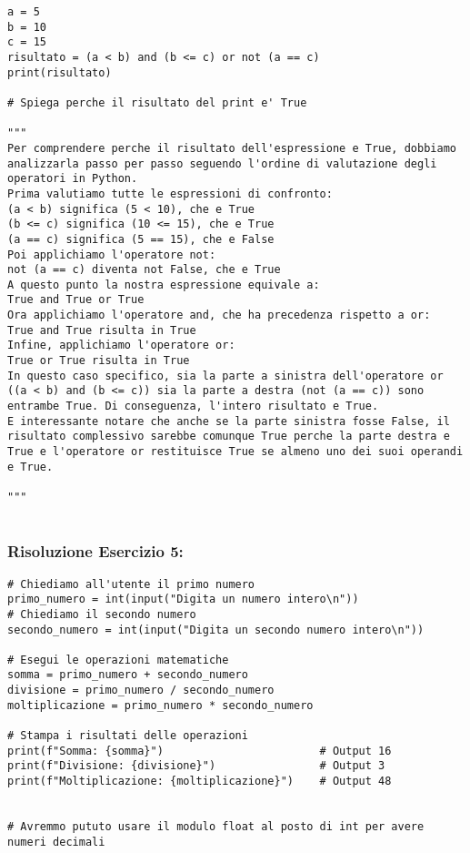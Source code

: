 \begin{lstlisting}
a = 5
b = 10
c = 15
risultato = (a < b) and (b <= c) or not (a == c)
print(risultato)

# Spiega perche il risultato del print e' True

"""
Per comprendere perche il risultato dell'espressione e True, dobbiamo analizzarla passo per passo seguendo l'ordine di valutazione degli operatori in Python.
Prima valutiamo tutte le espressioni di confronto:
(a < b) significa (5 < 10), che e True
(b <= c) significa (10 <= 15), che e True
(a == c) significa (5 == 15), che e False
Poi applichiamo l'operatore not:
not (a == c) diventa not False, che e True
A questo punto la nostra espressione equivale a:
True and True or True
Ora applichiamo l'operatore and, che ha precedenza rispetto a or:
True and True risulta in True
Infine, applichiamo l'operatore or:
True or True risulta in True
In questo caso specifico, sia la parte a sinistra dell'operatore or ((a < b) and (b <= c)) sia la parte a destra (not (a == c)) sono entrambe True. Di conseguenza, l'intero risultato e True.
E interessante notare che anche se la parte sinistra fosse False, il risultato complessivo sarebbe comunque True perche la parte destra e True e l'operatore or restituisce True se almeno uno dei suoi operandi e True.

"""


\end{lstlisting}



\vspace{0.3cm}

\subsubsection{Risoluzione Esercizio 5: \textit{}}

\begin{lstlisting}
# Chiediamo all'utente il primo numero
primo_numero = int(input("Digita un numero intero\n"))
# Chiediamo il secondo numero
secondo_numero = int(input("Digita un secondo numero intero\n"))

# Esegui le operazioni matematiche
somma = primo_numero + secondo_numero
divisione = primo_numero / secondo_numero
moltiplicazione = primo_numero * secondo_numero

# Stampa i risultati delle operazioni
print(f"Somma: {somma}")                        # Output 16
print(f"Divisione: {divisione}")                # Output 3
print(f"Moltiplicazione: {moltiplicazione}")    # Output 48


# Avremmo pututo usare il modulo float al posto di int per avere numeri decimali


\end{lstlisting}



